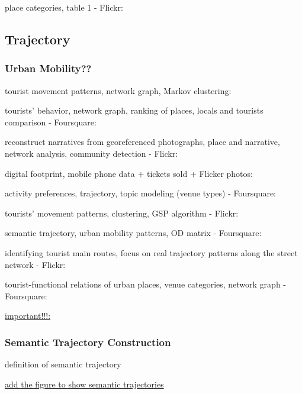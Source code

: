 \documentclass{article}
\begin{document}
place categories, table 1 - Flickr: \cite{donaire_tourist_2014}


\subsection{Trajectory}

\subsubsection{Urban Mobility??}
tourist movement patterns, network graph, Markov clustering: \cite{hu_graph-based_2019}

tourists' behavior, network graph, ranking of places, locals and tourists comparison - Foursquare: \cite{ferreira_beyond_2015}

reconstruct narratives from georeferenced photographs, place and narrative, network analysis, community detection - Flickr: \cite{straumann_towards_2014}

digital footprint, mobile phone data + tickets sold + Flicker photos: \cite{girardin_digital_2008}

activity preferences, trajectory, topic modeling (venue types) - Foursquare: \cite{vu_discovering_2019}

tourists' movement patterns, clustering, GSP algorithm - Flickr: \cite{hopken_flickr_2020}

semantic trajectory, urban mobility patterns, OD matrix - Foursquare: \cite{nin_tweets_2014}

identifying tourist main routes, focus on real trajectory patterns along the street network - Flickr: \cite{mohino_identifying_2018}

tourist-functional relations of urban places, venue categories, network graph - Foursquare: \cite{yang_identifying_2021}

\underline{important!!!: \cite{parent_semantic_2013}}

\subsubsection{Semantic Trajectory Construction}
definition of semantic trajectory

\underline{add the figure to show semantic trajectories}
\end{document}
